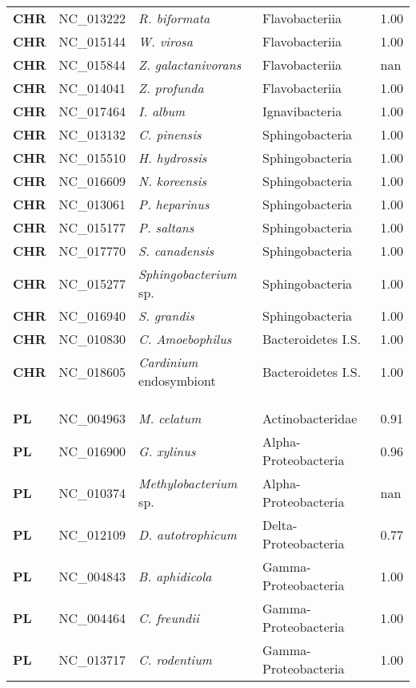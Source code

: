 \begin{adjustwidth}{-3cm}{2cm}
{\begin{supertabular}{>{\bfseries}l|p{0.1\textwidth}p{0.14\textwidth}l|l}
CHR & NC\_013222 & \textit{R. biformata} & Flavobacteriia & 1.00\\
CHR & NC\_015144 & \textit{W. virosa} & Flavobacteriia & 1.00\\
CHR & NC\_015844 & \textit{Z. galactanivorans} & Flavobacteriia & nan\\
CHR & NC\_014041 & \textit{Z. profunda} & Flavobacteriia & 1.00\\
CHR & NC\_017464 & \textit{I. album} & Ignavibacteria & 1.00\\
CHR & NC\_013132 & \textit{C. pinensis} & Sphingobacteria & 1.00\\
CHR & NC\_015510 & \textit{H. hydrossis} & Sphingobacteria & 1.00\\
CHR & NC\_016609 & \textit{N. koreensis} & Sphingobacteria & 1.00\\
CHR & NC\_013061 & \textit{P. heparinus} & Sphingobacteria & 1.00\\
CHR & NC\_015177 & \textit{P. saltans} & Sphingobacteria & 1.00\\
CHR & NC\_017770 & \textit{S. canadensis} & Sphingobacteria & 1.00\\
CHR & NC\_015277 & \textit{Sphingobacterium} sp. & Sphingobacteria & 1.00\\
CHR & NC\_016940 & \textit{S. grandis} & Sphingobacteria & 1.00\\
CHR & NC\_010830 & \textit{C. Amoebophilus} & Bacteroidetes I.S. & 1.00\\
CHR & NC\_018605 & \textit{Cardinium} endosymbiont & Bacteroidetes I.S. & 1.00\\
\\
\\
\hline\\
PL & NC\_004963 & \textit{M. celatum} & Actinobacteridae & 0.91\\
PL & NC\_016900 & \textit{G. xylinus} & Alpha-Proteobacteria & 0.96\\
PL & NC\_010374 & \textit{Methylobacterium} sp. & Alpha-Proteobacteria & nan\\
PL & NC\_012109 & \textit{D. autotrophicum} & Delta-Proteobacteria & 0.77\\
PL & NC\_004843 & \textit{B. aphidicola} & Gamma-Proteobacteria & 1.00\\
PL & NC\_004464 & \textit{C. freundii} & Gamma-Proteobacteria & 1.00\\
PL & NC\_013717 & \textit{C. rodentium} & Gamma-Proteobacteria & 1.00\\

\end{supertabular}}
\end{adjustwidth}
